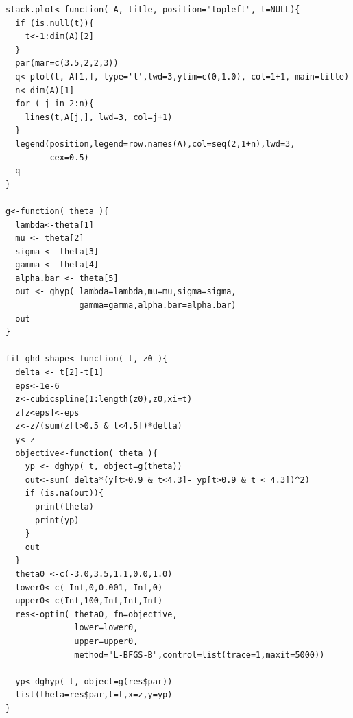 \documentclass{amsart}
\begin{document}
\begin{verbatim}
stack.plot<-function( A, title, position="topleft", t=NULL){
  if (is.null(t)){
    t<-1:dim(A)[2]
  }
  par(mar=c(3.5,2,2,3))
  q<-plot(t, A[1,], type='l',lwd=3,ylim=c(0,1.0), col=1+1, main=title)
  n<-dim(A)[1]
  for ( j in 2:n){
    lines(t,A[j,], lwd=3, col=j+1)
  }
  legend(position,legend=row.names(A),col=seq(2,1+n),lwd=3,
         cex=0.5)
  q
}

g<-function( theta ){
  lambda<-theta[1]
  mu <- theta[2]
  sigma <- theta[3]
  gamma <- theta[4]
  alpha.bar <- theta[5]
  out <- ghyp( lambda=lambda,mu=mu,sigma=sigma,
               gamma=gamma,alpha.bar=alpha.bar)
  out
}

fit_ghd_shape<-function( t, z0 ){
  delta <- t[2]-t[1]
  eps<-1e-6
  z<-cubicspline(1:length(z0),z0,xi=t)
  z[z<eps]<-eps
  z<-z/(sum(z[t>0.5 & t<4.5])*delta)
  y<-z
  objective<-function( theta ){
    yp <- dghyp( t, object=g(theta))
    out<-sum( delta*(y[t>0.9 & t<4.3]- yp[t>0.9 & t < 4.3])^2)
    if (is.na(out)){
      print(theta)
      print(yp)    
    }
    out
  }
  theta0 <-c(-3.0,3.5,1.1,0.0,1.0)
  lower0<-c(-Inf,0,0.001,-Inf,0)
  upper0<-c(Inf,100,Inf,Inf,Inf)
  res<-optim( theta0, fn=objective,
              lower=lower0,
              upper=upper0,
              method="L-BFGS-B",control=list(trace=1,maxit=5000))
  
  yp<-dghyp( t, object=g(res$par))
  list(theta=res$par,t=t,x=z,y=yp)
}

\end{verbatim}
  
  
\end{document}
